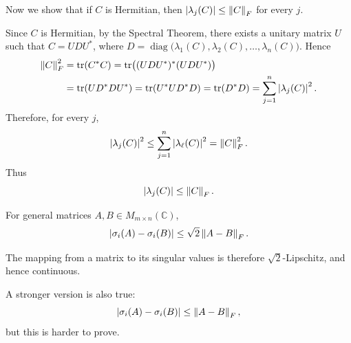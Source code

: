 \begin{remark}
Now we show that if $C$ is Hermitian, then $\left\lvert \lambda_j(C) \right\rvert\le\left\lVert C \right\rVert_F$ for every $j$.

Since $C$ is Hermitian, by the Spectral Theorem, there exists a unitary matrix
$U$ such that $C=UDU^*$, where
$D=\operatorname{diag}\bigl(\lambda_1(C),\lambda_2(C),\ldots,\lambda_n(C)\bigr)$.
Hence
\begin{align*}
    \left\lVert C \right\rVert_F^2
    &=\operatorname{tr}(C^*C) = \operatorname{tr}\bigl((UDU^*)^*(UDU^*)\bigr)\\
    &=\operatorname{tr}(UD^*DU^*)=\operatorname{tr}(U^*UD^*D)=\operatorname{tr}(D^*D)=\sum_{j=1}^n \left\lvert \lambda_j(C) \right\rvert^2.
\end{align*}
Therefore, for every $j$,
\[
    \left\lvert \lambda_j(C) \right\rvert^2
    \le
    \sum_{j=1}^n \left\lvert \lambda_\ell(C) \right\rvert^2
    =
    \left\lVert C \right\rVert_F^2.
\]
Thus
\[
    \left\lvert \lambda_j(C) \right\rvert
    \le
    \left\lVert C \right\rVert_F.
\]
\end{remark}





\begin{theorem}
For general matrices $A,B\in M_{m\times n}(\mathbb{C})$,
\[
    \left\lvert \sigma_i(A)-\sigma_i(B) \right\rvert
    \le
    \sqrt{2}\left\lVert A-B \right\rVert_F.
\]
\end{theorem}

\begin{remark}
The mapping from a matrix to its singular values is therefore
$\sqrt{2}$-Lipschitz, and hence continuous.

A stronger version is also true:
\[
    \left\lvert \sigma_i(A)-\sigma_i(B) \right\rvert
    \le
    \left\lVert A-B \right\rVert_F,
\]
but this is harder to prove.
\end{remark}

